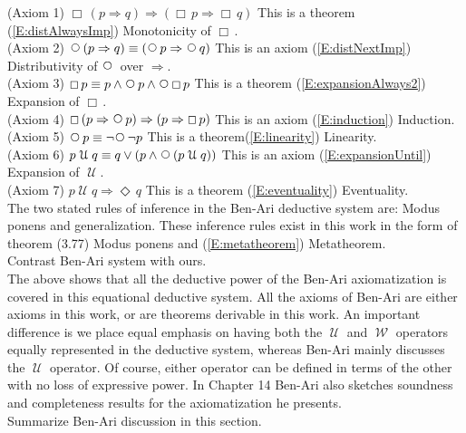 \documentclass[12pt, fleqn, leqno]{article}
\newcommand{\impl}{\ensuremath{\Rightarrow}}        %
\newcommand{\Until}{\;\mathcal{U}\;}
\newcommand{\Wait}{\;\mathcal{W}\;}
\newcommand{\Next}{\;\,\text{\raisebox{3.5pt}{\circle{6}}}}
\newcommand{\Event}{\Diamond\,}
\newcommand{\Always}{\Box\,}
\begin{document}
(Axiom 1) $\Always (p \impl q)  \impl ( \Always p \impl \Always q)$ This is a theorem
 (\ref{E:distAlwaysImp}) Monotonicity of $\Always$.\\

(Axiom 2) $\Next (p \impl q)  \equiv ( \Next p \impl \Next q)$ 
This is an axiom (\ref{E:distNextImp}) Distributivity of $\Next$ over $\impl$.\\

(Axiom 3) $\Always p \equiv p \land \Next p \land \Next\Always p$ This is a theorem
 (\ref{E:expansionAlways2}) Expansion of $\Always$.\\
 
 (Axiom 4) $\Always  (p \impl \Next p)  \impl   (p \impl \Always p)$ This is an axiom (\ref{E:induction}) Induction.\\
 
 (Axiom 5) $\Next p \equiv \neg\Next\neg p$ This is a theorem(\ref{E:linearity}) Linearity.\\
 
 (Axiom 6) $p \Until q \equiv q \lor (p \land \Next (p \Until q))$ This is an axiom (\ref{E:expansionUntil}) Expansion of $\Until$.\\

(Axiom 7) $p \Until q \impl \Event q$ This is a theorem (\ref{E:eventuality}) Eventuality.\\

The two stated rules of inference in the Ben-Ari deductive system are: Modus ponens and generalization.
These inference rules exist in this work in the form of  
theorem (3.77) Modus ponens and (\ref{E:metatheorem}) Metatheorem.\\

Contrast Ben-Ari system with ours.\\

The above shows that all the deductive power of the Ben-Ari axiomatization is covered in this equational deductive system. All the axioms of Ben-Ari are either axioms in this work, or are theorems derivable in this work.
An important difference is we place equal emphasis on having both the $\Until$ and $\Wait$
operators equally represented in the deductive system, whereas Ben-Ari mainly discusses the $\Until$ operator.
Of course, either operator can be defined in terms of the other with no loss of expressive power. In Chapter 14 Ben-Ari also
sketches soundness and completeness results for the axiomatization he presents.\\

Summarize Ben-Ari discussion in this section.\\
\end{document}
